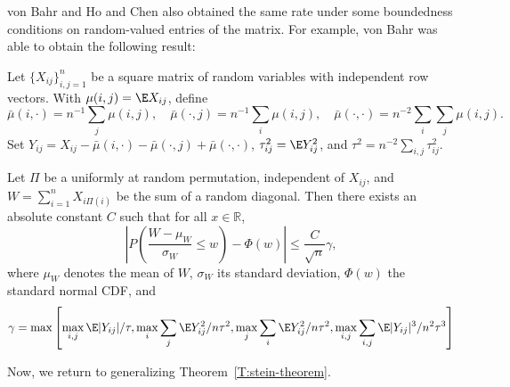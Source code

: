 von Bahr \cite{bahr1976remainder} and Ho and Chen \cite{ho1978l_p}
also obtained the same rate under some boundedness conditions
on random-valued entries of the matrix.  For example, von
Bahr was able to obtain the following result:
\begin{theorem}
  Let $\{X_{ij}\}_{i, j = 1}^n$ be a square matrix of random variables with
  independent row vectors.
  With $\mu(i, j) = \E X_{ij}$, define
  \begin{equation*}
    \bar{\mu}(i, \cdot) = n^{-1} \sum_j \mu(i, j), \quad
    \bar{\mu}(\cdot, j) = n^{-1} \sum_i \mu(i, j), \quad
    \bar{\mu}(\cdot, \cdot) = n^{-2} \sum_i \sum_j \mu(i, j). \quad
  \end{equation*}
  Set $Y_{ij} = X_{ij} - \bar{\mu}(i, \cdot) - \bar{\mu}(\cdot, j) + \bar{\mu}(\cdot, \cdot)$,
  $\tau_{ij}^2 = \E Y_{ij}^2$, and $\tau^2 = n^{-2} \sum_{i, j} \tau_{ij}^2$.

  Let $\Pi$ be a uniformly at random permutation, independent of $X_{ij}$, and
  $W = \sum_{i=1}^n X_{i\Pi(i)}$ be the sum of a random diagonal.
  Then there exists an absolute constant $C$ such that for all $x \in \mathbb{R}$,
  \begin{equation*}
    \left |P \left (\frac{W - \mu_W}{\sigma_W} \leq w \right ) - \Phi(w) \right |
    \leq \frac{C}{\sqrt{n}} \gamma,
  \end{equation*}
  where $\mu_W$ denotes the mean of $W$, $\sigma_W$ its standard deviation,
  $\Phi(w)$ the standard normal CDF, and
  \begin{equation*}
    \gamma = \max \left [
      \max_{i, j} \E |Y_{ij}| / \tau,
      \max_i \sum_j \E Y_{ij}^2 / n \tau^2,
      \max_j \sum_i \E Y_{ij}^2 / n \tau^2,
      \max_{i, j} \sum_{i, j} \E |Y_{ij}|^3 / n^2 \tau^3
    \right ]
  \end{equation*}
\end{theorem}

Now, we return to generalizing Theorem~\ref{T:stein-theorem}.




